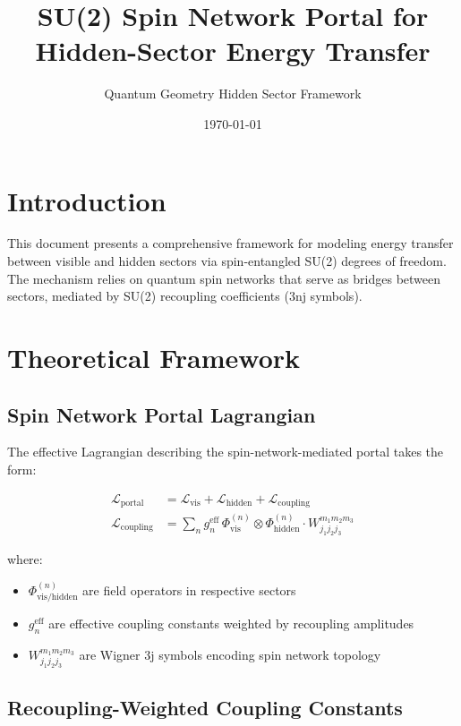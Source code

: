 \documentclass{article}
\title{SU(2) Spin Network Portal for Hidden-Sector Energy Transfer}
\author{Quantum Geometry Hidden Sector Framework}
\date{\today}
\begin{document}
\maketitle

\section{Introduction}

This document presents a comprehensive framework for modeling energy transfer between visible and hidden sectors via spin-entangled SU(2) degrees of freedom. The mechanism relies on quantum spin networks that serve as bridges between sectors, mediated by SU(2) recoupling coefficients (3nj symbols).

\section{Theoretical Framework}

\subsection{Spin Network Portal Lagrangian}

The effective Lagrangian describing the spin-network-mediated portal takes the form:

\begin{align}
\mathcal{L}_{\text{portal}} &= \mathcal{L}_{\text{vis}} + \mathcal{L}_{\text{hidden}} + \mathcal{L}_{\text{coupling}} \\
\mathcal{L}_{\text{coupling}} &= \sum_{n} g_n^{\text{eff}} \, \Phi_{\text{vis}}^{(n)} \otimes \Phi_{\text{hidden}}^{(n)} \cdot W_{j_1j_2j_3}^{m_1m_2m_3}
\end{align}

where:
\begin{itemize}
\item $\Phi_{\text{vis/hidden}}^{(n)}$ are field operators in respective sectors
\item $g_n^{\text{eff}}$ are effective coupling constants weighted by recoupling amplitudes
\item $W_{j_1j_2j_3}^{m_1m_2m_3}$ are Wigner 3j symbols encoding spin network topology
\end{itemize}

\subsection{Recoupling-Weighted Coupling Constants}
\end{document}
